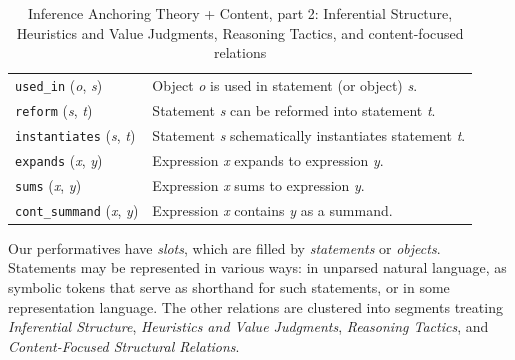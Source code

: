 \documentclass[smallextended,oneside]{svjour3}       %
\let\cite\citep
\newcommand\nothing[1]{#1}
\let\paragraph\nothing
\begin{document}
\begin{table}[ht]
\begin{mdframed}
\noindent
\begin{tabular}{@{\hspace{-.25ex}}p{}p{}}
\texttt{used\_in} (\emph{o}, \emph{s}) & Object \emph{o} is used in statement (or object) \emph{s}.\\
\texttt{reform} (\emph{s}, \emph{t}) & Statement \emph{s} can be reformed into statement \emph{t}.\\
\texttt{instantiates} (\emph{s}, \emph{t}) & Statement \emph{s} schematically instantiates statement \emph{t}. \\
\texttt{expands} (\emph{x}, \emph{y}) & Expression \emph{x} expands to expression \emph{y}.\\
\texttt{sums} (\emph{x}, \emph{y}) & Expression \emph{x} sums to expression \emph{y}. \\
\texttt{cont\_summand} (\emph{x}, \emph{y}) & Expression \emph{x} contains \emph{y} as a summand. \\
\end{tabular}
\end{mdframed}
\caption{Inference Anchoring Theory + Content, part 2: Inferential Structure, Heuristics and Value Judgments, Reasoning Tactics, and content-focused relations\label{iatc-table:2}}
\end{table}
\FloatBarrier


Our performatives have \emph{slots}, which are filled by
\emph{statements} or \emph{objects}.  Statements may be represented in various ways:
in unparsed natural language, as symbolic tokens that serve as
shorthand for such statements, or in some representation language.
\paragraph{The other relations are clustered into segments treating \emph{Inferential Structure}, \emph{Heuristics and Value Judgments}, \emph{Reasoning Tactics}, and \emph{Content-Focused Structural Relations}.}
\end{document}
